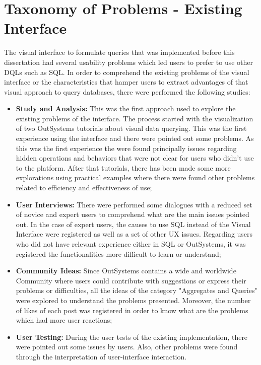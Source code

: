 \chapter{Taxonomy of Problems - Existing Interface}
\label{app:taxonomy_of_problems_existing_interface}

The visual interface to formulate queries that was implemented before this dissertation had several usability problems which led users to prefer to use other \glspl{DQL} such as SQL. In order to comprehend the existing problems of the visual interface or the characteristics that hamper users to extract advantages of that visual approach to query databases, there were performed the following studies:

\begin{itemize}
    \item \textbf{Study and Analysis:} This was the first approach used to explore the existing problems of the interface. The process started with the visualization of two OutSystems tutorials \cite{outsystems_tutorial_aggregates_101, outsystems_tutorial_advanced_aggregates} about visual data querying. This was the first experience using the interface and there were pointed out some problems. As this was the first experience the were found principally issues regarding hidden operations and behaviors that were not clear for users who didn't use to the platform. After that tutorials, there has been made some more explorations using practical examples where there were found other problems related to efficiency and effectiveness of use;
    \item \textbf{User Interviews:} There were performed some dialogues with a reduced set of novice and expert users to comprehend what are the main issues pointed out. In the case of expert users, the causes to use SQL instead of the Visual Interface were registered as well as a set of other \gls{UX} issues. Regarding users who did not have relevant experience either in SQL or OutSystems, it was registered the functionalities more difficult to learn or understand;
    \item \textbf{Community Ideas:} Since OutSystems contains a wide and worldwide Community where users could contribute with suggestions or express their problems or difficulties, all the ideas of the category "Aggregates and Queries" were explored to understand the problems presented. Moreover, the number of likes of each post was registered in order to know what are the problems which had more user reactions; 
    \item \textbf{User Testing:} During the user tests of the existing implementation, there were pointed out some issues by users. Also, other problems were found through the interpretation of user-interface interaction.
\end{itemize}

